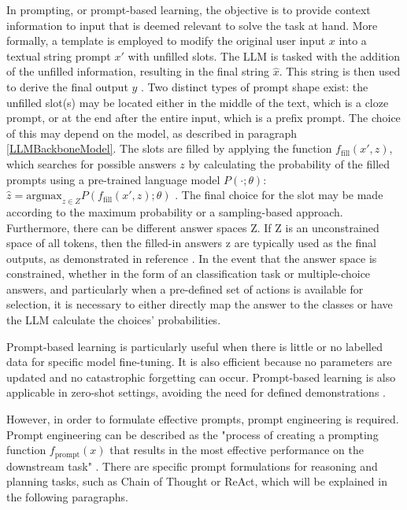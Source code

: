 \documentclass{article}
\begin{document}
In prompting, or prompt-based learning, the objective is to provide context information to input that is deemed relevant to solve the task at hand. More formally, a template is employed to modify the original user input $x$ into a textual string prompt $x'$ with unfilled slots. The LLM is tasked with the addition of the unfilled information, resulting in the final string $\hat{x}$. This string is then used to derive the final output $y$ \cite{liu_pre-train_2021}. Two distinct types of prompt shape exist: the unfilled slot(s) may be located either in the middle of the text, which is a cloze prompt, or at the end after the entire input, which is a prefix prompt. The choice of this may depend on the model, as described in paragraph \ref{LLMBackboneModel}. 
The slots are filled by applying the function $f_{\text{fill}}(x', z)$, which searches for possible answers $z$ by calculating the probability of the filled prompts using a pre-trained language model $P(\cdot; \theta)$: $\hat{z} = \text{argmax}_{z \in Z} P(f_{\text{fill}}(x',z);\theta)$ \cite{liu_pre-train_2021}. The final choice for the slot may be made according to the maximum probability or a sampling-based approach. 
Furthermore, there can be different answer spaces Z. If Z is an unconstrained space of all tokens, then the filled-in answers z are typically used as the final outputs, as demonstrated in reference \cite{liu_pre-train_2021}. In the event that the answer space is constrained, whether in the form of an classification task or multiple-choice answers, and particularly when a pre-defined set of actions is available for selection, it is necessary to either directly map the answer to the classes or have the LLM calculate the choices' probabilities.

Prompt-based learning is particularly useful when there is little or no labelled data for specific model fine-tuning. It is also efficient because no parameters are updated and no catastrophic forgetting can occur. Prompt-based learning is also applicable in zero-shot settings, avoiding the need for defined demonstrations \cite{liu_pre-train_2021}.

However, in order to formulate effective prompts, prompt engineering is required. 
Prompt engineering can be described as the "process of creating a prompting function $f_{\text{prompt}}(x)$  that results in the most effective performance on the downstream task" \cite{liu_pre-train_2021}. 
There are specific prompt formulations for reasoning and planning tasks, such as Chain of Thought or ReAct, which will be explained in the following paragraphs.
\end{document}
